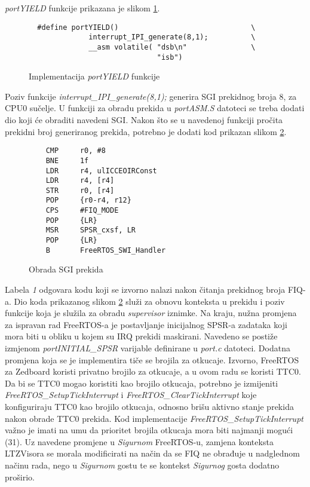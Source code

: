 \documentclass[times, utf8, diplomski, numeric]{fer}
\begin{document}
\textit{portYIELD} funkcije prikazana je slikom \ref{portyield}.
\begin{figure}[H]
  \begin{lstlisting}
  #define portYIELD()                               \
              interrupt_IPI_generate(8,1);          \
              __asm volatile( "dsb\n"               \
                              "isb")
  \end{lstlisting}
  \caption{Implementacija \textit{portYIELD} funkcije}
  \label{portyield}
\end{figure}
Poziv funkcije \textit{interrupt\_IPI\_generate(8,1);} generira SGI prekidnog broja 8, za CPU0 sučelje. U funkciji za
obradu prekida u \textit{portASM.S} datoteci se treba dodati dio koji će obraditi navedeni SGI. Nakon što se u navedenoj
funkciji pročita prekidni broj generiranog prekida, potrebno je dodati kod prikazan slikom \ref{sgi}.
\begin{figure}[H]
  \lstset{breaklines=true, xleftmargin=.05\textwidth}
  \begin{lstlisting}
    CMP		r0, #8
    BNE		1f
    LDR 	r4, ulICCEOIRConst
    LDR		r4, [r4]
    STR		r0, [r4]
    POP		{r0-r4, r12}
    CPS		#FIQ_MODE
    POP		{LR}
    MSR		SPSR_cxsf, LR
    POP		{LR}
    B		FreeRTOS_SWI_Handler
  \end{lstlisting}
  \caption{Obrada SGI prekida}
  \label{sgi}
\end{figure}
Labela \textit{1} odgovara kodu koji se izvorno nalazi nakon čitanja prekidnog broja FIQ-a. Dio koda prikazanog
slikom \ref{sgi} služi za obnovu konteksta u prekidu i poziv funkcije koja je služila za obradu \textit{supervisor} iznimke.
Na kraju, nužna promjena za ispravan rad FreeRTOS-a je postavljanje inicijalnog SPSR-a zadataka koji mora biti u obliku u
kojem su IRQ prekidi maskirani. Navedeno se postiže izmjenom \textit{portINITIAL\_SPSR} varijable definirane u \textit{port.c}
datoteci.
Dodatna promjena koja se je implementira tiče se brojila za otkucaje. Izvorno, FreeRTOS za Zedboard koristi privatno brojilo
za otkucaje, a u ovom radu se koristi TTC0. Da bi se TTC0 mogao koristiti kao brojilo otkucaja, potrebno je izmijeniti
\textit{FreeRTOS\_SetupTickInterrupt} i \textit{FreeRTOS\_ClearTickInterrupt} koje konfiguriraju TTC0 kao brojilo otkucaja,
odnosno brišu aktivno stanje prekida nakon obrade TTC0 prekida. Kod implementacije \textit{FreeRTOS\_SetupTickInterrupt}
važno je imati na umu da prioritet brojila otkucaja mora biti najmanji mogući (31).
Uz navedene promjene u \textit{Sigurnom} FreeRTOS-u, zamjena konteksta LTZVisora se morala modificirati na način da se
FIQ ne obrađuje u nadglednom načinu rada, nego u \textit{Sigurnom} gostu te se kontekst \textit{Sigurnog} gosta dodatno
proširio.
\end{document}

